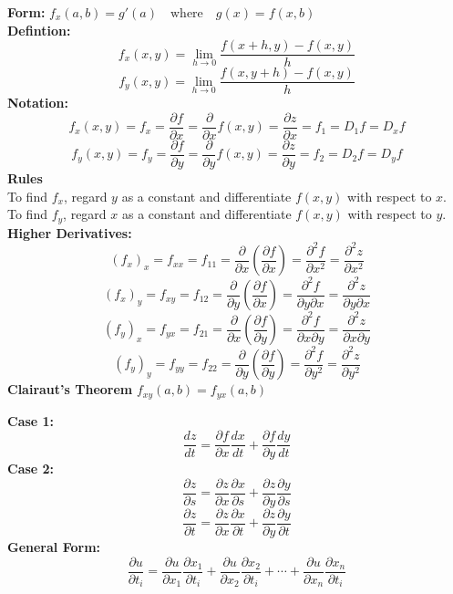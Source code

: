 \documentclass[2pt]{article}
\begin{document}
\begin{multicols}{2}
\begin{tcolorbox}[title=\textbf{Partial Derivatives}, colframe=lightblue]
    \textbf{Form:} 	$ f_x(a, b) = g'(a) \quad \text{where} \quad g(x) = f(x, b) $ \\
    \textbf{Defintion:} 
    \[f_x(x, y) = \lim_{{h \to 0}} \frac{f(x + h, y) - f(x, y)}{h}\]
    \[f_y(x, y) = \lim_{{h \to 0}} \frac{f(x, y + h) - f(x, y)}{h}\]
    \textbf{Notation:} 
    \[ f_x(x, y) = f_x = \frac{\partial f}{\partial x} = \frac{\partial}{\partial x} f(x, y) = \frac{\partial z}{\partial x} = f_1 = D_1 f = D_x f \]
    \[ f_y(x, y) = f_y = \frac{\partial f}{\partial y} = \frac{\partial}{\partial y} f(x, y) = \frac{\partial z}{\partial y} = f_2 = D_2 f = D_y f \]
    \textbf{Rules} \\
    To find $f_x$, regard $y$ as a constant and differentiate $f(x, y)$ with respect to $x$.\\
    To find $f_y$, regard $x$ as a constant and differentiate $f(x, y)$ with respect to $y$. \\
    \textbf{Higher Derivatives:}
    \[(f_x)_x = f_{xx} = f_{11} = \frac{\partial}{\partial x} \left( \frac{\partial f}{\partial x} \right) = \frac{\partial^2 f}{\partial x^2} = \frac{\partial^2 z}{\partial x^2}\]
    \[(f_x)_y = f_{xy} = f_{12} = \frac{\partial}{\partial y} \left( \frac{\partial f}{\partial x} \right) = \frac{\partial^2 f}{\partial y \partial x} = \frac{\partial^2 z}{\partial y \partial x} \]
    \[ (f_y)_x = f_{yx} = f_{21} = \frac{\partial}{\partial x} \left( \frac{\partial f}{\partial y} \right) = \frac{\partial^2 f}{\partial x \partial y} = \frac{\partial^2 z}{\partial x \partial y} \]
    \[(f_y)_y = f_{yy} = f_{22} = \frac{\partial}{\partial y} \left( \frac{\partial f}{\partial y} \right) = \frac{\partial^2 f}{\partial y^2} = \frac{\partial^2 z}{\partial y^2} \]
    \textbf{Clairaut's Theorem} $ f_{xy}(a, b) = f_{yx}(a, b) $
\end{tcolorbox}

\begin{tcolorbox}[title=\textbf{Chain Rule}, colframe=lightblue]
    \textbf{Case 1:} 	
    \[ \frac{dz}{dt} = \frac{\partial f}{\partial x} \frac{dx}{dt} + \frac{\partial f}{\partial y} \frac{dy}{dt} \]
    \textbf{Case 2:}
    \[ \frac{\partial z}{\partial s} = \frac{\partial z}{\partial x} \frac{\partial x}{\partial s} + \frac{\partial z}{\partial y} \frac{\partial y}{\partial s} \]
    \[ \frac{\partial z}{\partial t} = \frac{\partial z}{\partial x} \frac{\partial x}{\partial t} + \frac{\partial z}{\partial y} \frac{\partial y}{\partial t} \]
    \textbf{General Form:}
    \[ \frac{\partial u}{\partial t_i} = \frac{\partial u}{\partial x_1} \frac{\partial x_1}{\partial t_i} + \frac{\partial u}{\partial x_2} \frac{\partial x_2}{\partial t_i} + \cdots + \frac{\partial u}{\partial x_n} \frac{\partial x_n}{\partial t_i} \]
\end{tcolorbox}


\end{multicols}
\end{document}
